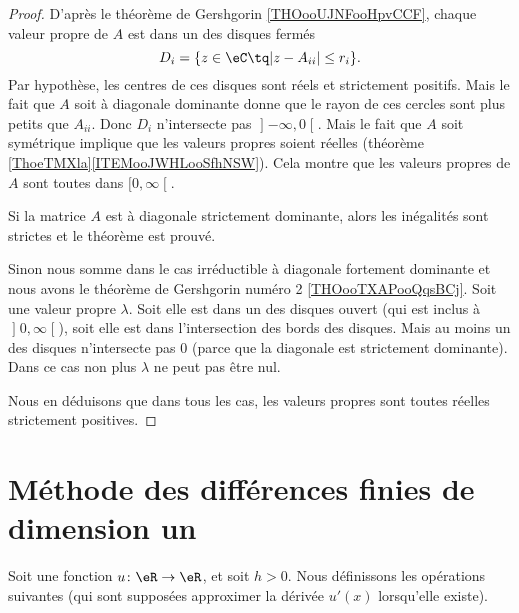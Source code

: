 \begin{proof}
    D'après le théorème de Gershgorin \ref{THOooUJNFooHpvCCF}, chaque valeur propre de \( A\) est dans un des disques fermés
    \begin{equation}
        D_i=\{ z\in \eC\tq | z-A_{ii} |\leq r_i \}.
    \end{equation}
Par hypothèse, les centres de ces disques sont réels et strictement positifs. Mais le fait que \( A\) soit à diagonale dominante donne que le rayon de ces cercles sont plus petits que \( A_{ii}\). Donc \( D_i\) n'intersecte pas \( \mathopen] -\infty , 0 \mathclose[\). Mais le fait que \( A\) soit symétrique implique que les valeurs propres soient réelles (théorème \ref{ThoeTMXla}\ref{ITEMooJWHLooSfhNSW}). Cela montre que les valeurs propres de \( A\) sont toutes dans \( \mathopen[ 0 , \infty \mathclose[\).

    Si la matrice \( A\) est à diagonale strictement dominante, alors les inégalités sont strictes et le théorème est prouvé.

Sinon nous somme dans le cas irréductible à diagonale fortement dominante et nous avons le théorème de Gershgorin numéro 2 \ref{THOooTXAPooQqsBCj}. Soit une valeur propre \( \lambda\). Soit elle est dans un des disques ouvert (qui est inclus à \( \mathopen] 0 , \infty \mathclose[\)), soit elle est dans l'intersection des bords des disques. Mais au moins un des disques n'intersecte pas \( 0\) (parce que la diagonale est strictement dominante). Dans ce cas non plus \( \lambda\) ne peut pas être nul. 

    Nous en déduisons que dans tous les cas, les valeurs propres sont toutes réelles strictement positives.
\end{proof}

\section{Méthode des différences finies de dimension un}

Soit une fonction \( u\colon \eR\to \eR\), et soit \( h>0\). Nous définissons les opérations suivantes (qui sont supposées approximer la dérivée \( u'(x)\) lorsqu'elle existe).

